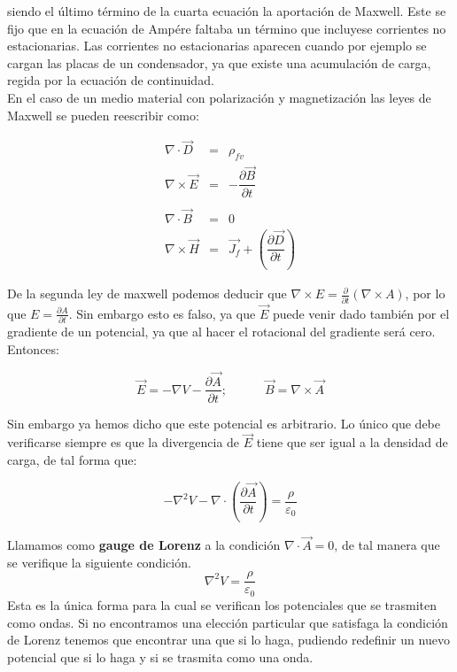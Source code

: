 \documentclass[12pt,a4paper]{article}
\newcommand{\parentesis}[1]{\left( #1  \right)}
\newcommand{\parciales}[2]{\frac{\partial #1}{\partial #2}}
\newcommand{\tquad}{\quad \quad \quad}
\newcommand{\rota}{\nabla \times}
\newcommand{\dive}{\nabla \cdot}
\begin{document}
siendo el último término de la cuarta ecuación la aportación de Maxwell. Este se fijo que en la ecuación de Ampére faltaba un término que incluyese corrientes no estacionarias. Las corrientes no estacionarias aparecen cuando por ejemplo se cargan las placas de un condensador, ya que existe una acumulación de carga, regida por la ecuación de continuidad. \\

En el caso de un medio material con polarización y magnetización las leyes de Maxwell se pueden reescribir como:


\begin{equation}
\begin{array}{lll}
\nabla \cdot \vec{D} & = & \rho_{fv} \\ 

\nabla \times \vec{E} & = & - \dfrac{\partial \vec{B}}{\partial t} \\ \\

\nabla \cdot \vec{B} & = & 0 \\ 

\nabla \times \vec{H} & = &  \vec{J_f} + \parentesis{\dfrac{\partial \vec{D}}{\partial t}}

\end{array}
\end{equation}

De la segunda ley de maxwell podemos deducir que $\rota E = \parciales{}{t} \parentesis{\rota A}$, por lo que $E = \parciales{A}{t}$. Sin embargo esto es falso, ya que $\vec{E}$ puede venir dado también por el gradiente de un potencial, ya que al hacer el rotacional del gradiente será cero. Entonces:

\begin{equation}
\vec{E} = -  \nabla V - \parciales{\vec{A}}{t} ; \tquad \vec{B} = \rota \vec{A}
\end{equation}

Sin embargo ya hemos dicho que este potencial es arbitrario. Lo único que debe verificarse siempre es que la divergencia de $\vec{E}$ tiene que ser igual a la densidad de carga, de tal forma que:

\begin{equation}
-\nabla^2 V - \dive \parentesis{\parciales{\vec{A}}{t}} = \dfrac{\rho}{\varepsilon_0}
\end{equation}

Llamamos como \textbf{gauge de Lorenz} a la condición $\dive \vec{A} = 0$, de tal manera que se verifique la siguiente condición. $$\nabla^2 V = \dfrac{\rho}{\varepsilon_0}$$ Esta es la única forma para la cual se verifican los potenciales que se trasmiten como ondas. Si no encontramos una elección particular que satisfaga la condición de Lorenz tenemos que encontrar una que si lo haga, pudiendo redefinir un nuevo potencial que si lo haga y si se trasmita como una onda.
\end{document}
